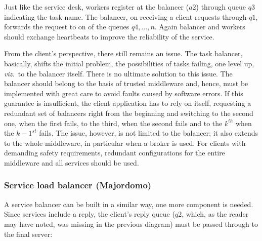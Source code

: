\documentclass[a4paper]{scrartcl}
\newcommand\viz{\textit{viz.}}
\newcommand{\menqOne}{\diamond}
\newcommand{\connect}[2]{
\draw [->,color=black] (#1) to (#2)
}
\begin{document}

Just like the service desk, workers register at the balancer ($a2$)
through queue $q3$ indicating the task name.
The balancer, on receiving a client requests through $q1$, 
forwards the request to on of the queues $q4, \dots, n$.
Again balancer and workers should exchange heartbeats
to improve the reliability of the service.

From the client's perspective, there still remains an issue.
The task balancer, basically, shifts the initial problem,
the possibilities of tasks failing, one level up,
\viz\ to the balancer itself. 
There is no ultimate solution to this issue.
The balancer should belong to the basis of trusted middleware
and, hence, must be implemented with great care
to avoid faults caused by software errors.
If this guarantee is insufficient,
the client application has to rely on itself,
requesting a redundant set of balancers right from the beginning
and switching to the second one, when the first fails,
to the third, when the second fails and to the $k^{th}$
when the $k-1^{st}$ fails.
The issue, however, is not limited to the balancer;
it also extends to the whole middleware, 
in particular when a broker is used.
For clients with demanding safety requirements,
redundant configurations for the entire middleware
and all services should be used.

\subsubsection{Service load balancer (Majordomo)}\label{subsub:balsrv}
A service balancer can be built in a similar way,
one more component is needed.
Since services include a reply, 
the client's reply queue 
($q2$, which, as the reader may have noted,
was missing in the previous diagram) 
must be passed through to the final server:
\end{document}
